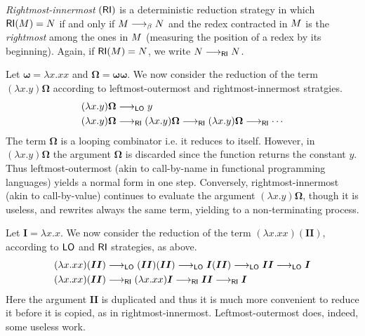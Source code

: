 \begin{definition}
	\emph{Rightmost-innermost} $(\textsf{RI})$ is a deterministic reduction
	strategy in which $\textsf{RI}(M)=N$ if and only if
	$M\longrightarrow_\beta N$ and the redex contracted in $M$ is
	the \emph{rightmost} among the ones in $M$ (measuring the
	position of a redex by its beginning). Again, if
	$\textsf{RI}(M)=N$, we write $N\longrightarrow_{\textsf{RI}}N$.
\end{definition}
\begin{example}\label{example:canc}
	Let $\bm{\omega}=\lambda x.xx$ and
	$\bm{\Omega}=\bm{\omega\omega}$. We now consider the reduction of
	the term $(\lambda x.y)\bm{\Omega}$ according to leftmost-outermost and
	rightmost-innermost stratgies.
	\begin{align*}
		(\lambda x.y)\bm{\Omega}&\longrightarrow_{\textsf{LO}} y\\
		(\lambda x.y)\bm{\Omega}&\longrightarrow_{\textsf{RI}}(\lambda x.y)\bm{\Omega}\longrightarrow_{\textsf{RI}}(\lambda x.y)\bm{\Omega}\longrightarrow_{\textsf{RI}}\cdots
	\end{align*}
	The term $\bm{\Omega}$ is a looping combinator i.e. it reduces to
	itself. However, in $(\lambda x.y)\bm{\Omega}$ the argument
	$\bm{\Omega}$ is discarded since the function returns the constant
	$y$. Thus leftmost-outermost (akin to call-by-name in functional
	programming languages) yields a normal form in one step. Conversely,
	rightmost-innermost (akin to call-by-value) continues to evaluate
	the argument $(\lambda x.y)\bm{\Omega}$, though it is useless, and
	rewrites always the same term, yielding to a non-terminating
	process.
\end{example}
\begin{example}\label{example:copy}
	Let $\bm{I}=\lambda x.x$. We now consider the reduction of the term
	$(\lambda x.xx)(\bm{II})$, according to $\textsf{LO}$ and $\textsf{RI}$
	strategies, as above.
	\begin{align*}
		(\lambda x.xx)(\bm{II})&\longrightarrow_{\textsf{LO}} (\bm{II})(\bm{II}) \longrightarrow_{\textsf{LO}}
		\bm{I}(\bm{II}) \longrightarrow_{\textsf{LO}} \bm{II} \longrightarrow_{\textsf{LO}} \bm{I}\\
		(\lambda x.xx)(\bm{II})&\longrightarrow_{\textsf{RI}} (\lambda x.xx)\bm{I} \longrightarrow_{\textsf{RI}} \bm{II} \longrightarrow_{\textsf{RI}} \bm{I}
	\end{align*}
	Here the argument $\bm{II}$ is duplicated and thus it is much more convenient
	to reduce it before it is copied, as in
	rightmost-innermost. Leftmost-outermost does, indeed, some useless
	work.
\end{example}
